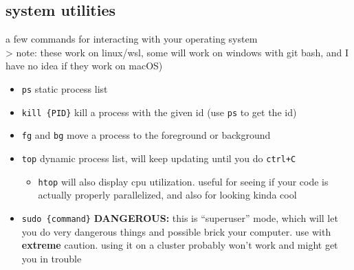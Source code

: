 \documentclass[
]{article}
\newenvironment{Shaded}{}{}
\newcommand{\AttributeTok}[1]{\textcolor[rgb]{0.49,0.56,0.16}{#1}}
\newcommand{\BuiltInTok}[1]{\textcolor[rgb]{0.00,0.50,0.00}{#1}}
\newcommand{\FunctionTok}[1]{\textcolor[rgb]{0.02,0.16,0.49}{#1}}
\newcommand{\KeywordTok}[1]{\textcolor[rgb]{0.00,0.44,0.13}{\textbf{#1}}}
\newcommand{\NormalTok}[1]{#1}
\newcommand{\OperatorTok}[1]{\textcolor[rgb]{0.40,0.40,0.40}{#1}}
\newcommand{\StringTok}[1]{\textcolor[rgb]{0.25,0.44,0.63}{#1}}
\newcommand{\VariableTok}[1]{\textcolor[rgb]{0.10,0.09,0.49}{#1}}
\providecommand{\tightlist}{%
  \setlength{\itemsep}{0pt}\setlength{\parskip}{0pt}}
\begin{document}
\begin{Shaded}
\end{Shaded}

\hypertarget{system-utilities}{%
\subsection{system utilities}\label{system-utilities}}

a few commands for interacting with your operating system\\
\textgreater{} note: these work on linux/wsl, some will work on windows
with git bash, and I have no idea if they work on macOS)

\begin{itemize}
\tightlist
\item
  \texttt{ps} static process list
\item
  \texttt{kill\ \{PID\}} kill a process with the given id (use
  \texttt{ps} to get the id)
\item
  \texttt{fg} and \texttt{bg} move a process to the foreground or
  background
\item
  \texttt{top} dynamic process list, will keep updating until you do
  \texttt{ctrl+C}

  \begin{itemize}
  \tightlist
  \item
    \texttt{htop} will also display cpu utilization. useful for seeing
    if your code is actually properly parallelized, and also for looking
    kinda cool
  \end{itemize}
\item
  \texttt{sudo\ \{command\}} \textbf{DANGEROUS:} this is ``superuser''
  mode, which will let you do very dangerous things and possible brick
  your computer. use with \textbf{extreme} caution. using it on a
  cluster probably won't work and might get you in trouble
\end{itemize}
\end{document}
